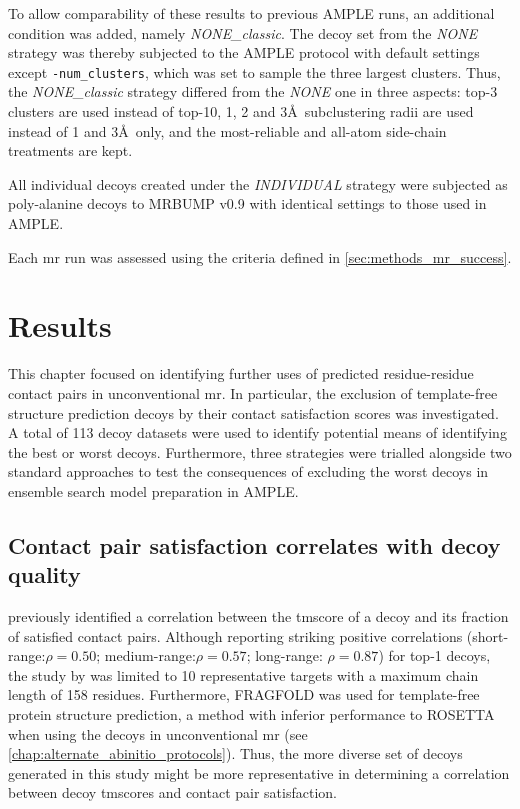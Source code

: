 To allow comparability of these results to previous AMPLE runs, an additional condition was added, namely \textit{NONE\_classic}. The decoy set from the \textit{NONE} strategy was thereby subjected to the AMPLE protocol with default settings except \texttt{-num\_clusters}, which was set to sample the three largest clusters. Thus, the \textit{NONE\_classic} strategy differed from the \textit{NONE} one in three aspects: top-3 clusters are used instead of top-10, 1, 2 and 3\AA\ subclustering radii are used instead of 1 and 3\AA\ only, and the most-reliable and all-atom side-chain treatments are kept.

All individual decoys created under the \textit{INDIVIDUAL} strategy were subjected as poly-alanine decoys to MRBUMP v0.9 \cite{Keegan2018-kn} with identical settings to those used in AMPLE. 

Each \gls{mr} run was assessed using the criteria defined in \cref{sec:methods_mr_success}.

\section{Results}
This chapter focused on identifying further uses of predicted residue-residue contact pairs in unconventional \gls{mr}. In particular, the exclusion of template-free structure prediction decoys by their contact satisfaction scores was investigated. A total of 113 decoy datasets were used to identify potential means of identifying the best or worst decoys. Furthermore, three strategies were trialled alongside two standard approaches to test the consequences of excluding the worst decoys in ensemble search model preparation in AMPLE.

\subsection{Contact pair satisfaction correlates with decoy quality} \label{subsec:ample_saint2_concorr}
\textcite{Kosciolek2014-bt} previously identified a correlation between the \gls{tmscore} of a decoy and its fraction of satisfied contact pairs. Although reporting striking positive correlations (short-range:$\rho=0.50$; medium-range:$\rho=0.57$; long-range: $\rho=0.87$) for top-1 decoys, the study by \textcite{Kosciolek2014-bt} was limited to 10 representative targets with a maximum chain length of 158 residues. Furthermore, FRAGFOLD \cite{Jones2001-mc} was used for template-free protein structure prediction, a method with inferior performance to ROSETTA \cite{Rohl2004-dj} when using the decoys in unconventional \gls{mr} (see \cref{chap:alternate_abinitio_protocols}). Thus, the more diverse set of decoys generated in this study might be more representative in determining a correlation between decoy \gls{tmscore}s and contact pair satisfaction.

